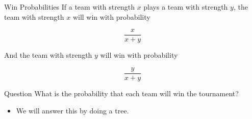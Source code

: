 \documentclass[
  ignorenonframetext,
]{beamer}
\providecommand{\tightlist}{%
  \setlength{\itemsep}{0pt}\setlength{\parskip}{0pt}}
\renewcommand{\,}{\text{, }}
\begin{document}
\begin{frame}{Win Probabilities}
\protect\hypertarget{win-probabilities}{}
If a team with strength \(x\) plays a team with strength \(y\), the team
with strength \(x\) will win with probability

\[
\frac{x}{x+ y}
\]

\bigskip

And the team with strength \(y\) will win with probability

\[
\frac{y}{x + y}
\]
\end{frame}

\begin{frame}{Question}
\protect\hypertarget{question}{}
What is the probability that each team will win the tournament?

\begin{itemize}[<+->]
\tightlist
\item
  We will answer this by doing a tree.
\end{itemize}
\end{frame}
\end{document}

